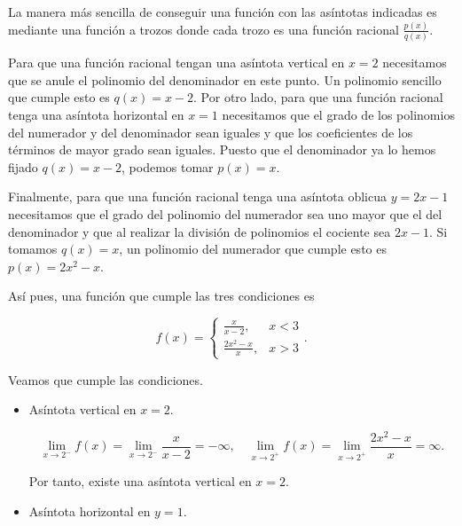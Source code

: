 \documentclass[
  spanish,
  a4paper,
]{scrreport}
\theoremstyle{definition}
\theoremstyle{remark}
\begin{document}
\begin{tcolorbox}[enhanced jigsaw, arc=.35mm, bottomrule=.15mm, bottomtitle=1mm, breakable, colback=white, colbacktitle=quarto-callout-tip-color!10!white, colframe=quarto-callout-tip-color-frame, coltitle=black, left=2mm, leftrule=.75mm, opacityback=0, opacitybacktitle=0.6, rightrule=.15mm, title=\textcolor{quarto-callout-tip-color}{\faLightbulb}\hspace{0.5em}{Solución}, titlerule=0mm, toprule=.15mm, toptitle=1mm]

La manera más sencilla de conseguir una función con las asíntotas
indicadas es mediante una función a trozos donde cada trozo es una
función racional \(\frac{p(x)}{q(x)}\).

Para que una función racional tengan una asíntota vertical en \(x=2\)
necesitamos que se anule el polinomio del denominador en este punto. Un
polinomio sencillo que cumple esto es \(q(x) = x-2\). Por otro lado,
para que una función racional tenga una asíntota horizontal en \(x=1\)
necesitamos que el grado de los polinomios del numerador y del
denominador sean iguales y que los coeficientes de los términos de mayor
grado sean iguales. Puesto que el denominador ya lo hemos fijado
\(q(x)=x-2\), podemos tomar \(p(x) = x\).

Finalmente, para que una función racional tenga una asíntota oblicua
\(y=2x-1\) necesitamos que el grado del polinomio del numerador sea uno
mayor que el del denominador y que al realizar la división de polinomios
el cociente sea \(2x-1\). Si tomamos \(q(x) = x\), un polinomio del
numerador que cumple esto es \(p(x) = 2x^2-x\).

Así pues, una función que cumple las tres condiciones es

\[
f(x) = \begin{cases}
\frac{x}{x-2}, & x < 3 \\
\frac{2x^2 - x}{x}, & x > 3
\end{cases}.
\]

Veamos que cumple las condiciones.

\begin{itemize}
\item
  Asíntota vertical en \(x=2\).

  \[
   \lim_{x \to 2^-} f(x) = \lim_{x \to 2^-} \frac{x}{x-2} = -\infty, \quad \lim_{x \to 2^+} f(x) = \lim_{x \to 2^+} \frac{2x^2 - x}{x} = \infty.
   \]

  Por tanto, existe una asíntota vertical en \(x=2\).
\item
  Asíntota horizontal en \(y=1\).


\end{itemize}
\end{tcolorbox}
\end{document}

